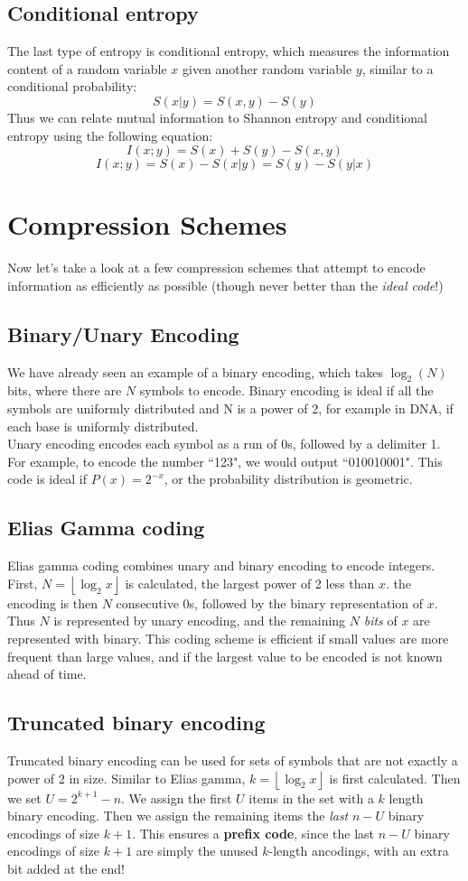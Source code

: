 \documentclass[12pt]{article}
\begin{document}
\subsection{Conditional entropy}
The last type of entropy is conditional entropy, which measures the information content of a random variable $x$ given another random variable $y$, similar to a conditional probability:
$$S(x|y) = S(x,y) - S(y)$$
Thus we can relate mutual information to Shannon entropy and conditional entropy using the following equation:
$$I(x;y) = S(x) + S(y) - S(x,y)$$
$$I(x;y) = S(x) - S(x|y) = S(y) - S(y|x)$$

\section{Compression Schemes}
Now let's take a look at a few compression schemes that attempt to encode information as efficiently as possible (though never better than the \textit{ideal code}!)
\subsection{Binary/Unary Encoding}
We have already seen an example of a binary encoding, which takes $\log_2(N)$ bits, where there are $N$ symbols to encode. Binary encoding is ideal if all the symbols are uniformly distributed and N is a power of 2, for example in DNA, if each base is uniformly distributed.\\[10pt]
Unary encoding encodes each symbol as a run of 0s, followed by a delimiter 1. For example, to encode the number ``123", we would output ``010010001". This code is ideal if $P(x) = 2^{-x}$, or the probability distribution is geometric.
\subsection{Elias Gamma coding}
Elias gamma coding combines unary and binary encoding to encode integers. First, $N = \left \lfloor{\log_2x}\right \rfloor $ is calculated, the largest power of 2 less than $x$. the encoding is then $N$ consecutive 0s, followed by the binary representation of $x$. Thus $N$ is represented by unary encoding, and the remaining $N$ \textit{bits} of $x$ are represented with binary. This coding scheme is efficient if small values are more frequent than large values, and if the largest value to be encoded is not known ahead of time.
\subsection{Truncated binary encoding}
Truncated binary encoding can be used for sets of symbols that are not exactly a power of 2 in size. Similar to Elias gamma, $k = \left \lfloor{\log_2x}\right \rfloor $ is first calculated. Then we set $U = 2^{k + 1} - n$. We assign the first $U$ items in the set with a $k$ length binary encoding. Then we assign the remaining items the \textit{last} $n-U$ binary encodings of size $k+1$. This ensures a \textbf{prefix code}, since the last $n-U$ binary encodings of size $k+1$ are simply the unused $k$-length ancodings, with an extra bit added at the end!
\end{document}
